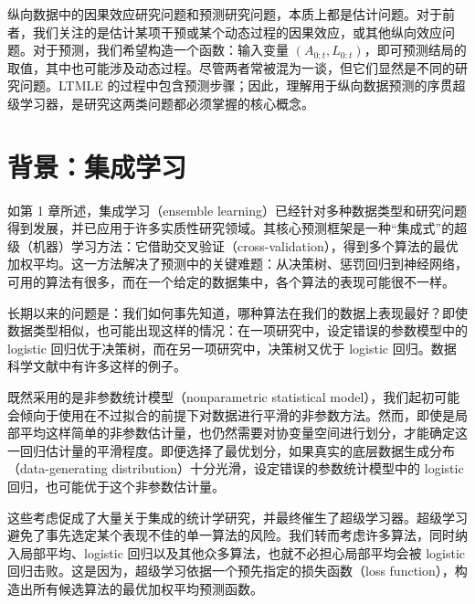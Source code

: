 \begin{sourcebox}[纵向数据中的效应估计与预测]
纵向数据中的因果效应研究问题和预测研究问题，本质上都是估计问题。对于前者，我们关注的是估计某项干预或某个动态过程的因果效应，或其他纵向效应问题。对于预测，我们希望构造一个函数：输入变量 $(A_{0:t},L_{0:t})$，即可预测结局的取值，其中也可能涉及动态过程。尽管两者常被混为一谈，但它们显然是不同的研究问题。LTMLE 的过程中包含预测步骤；因此，理解用于纵向数据预测的序贯超级学习器，是研究这两类问题都必须掌握的核心概念。
\end{sourcebox}

\section{背景：集成学习}
\label{sec:ch03-ensemble-background}

如第 1 章所述，集成学习（ensemble learning）已经针对多种数据类型和研究问题得到发展，并已应用于许多实质性研究领域。其核心预测框架是一种“集成式”的超级（机器）学习方法：它借助交叉验证（cross-validation），得到多个算法的最优加权平均。这一方法解决了预测中的关键难题：从决策树、惩罚回归到神经网络，可用的算法有很多，而在一个给定的数据集中，各个算法的表现可能很不一样。

长期以来的问题是：我们如何事先知道，哪种算法在我们的数据上表现最好？即使数据类型相似，也可能出现这样的情况：在一项研究中，设定错误的参数模型中的 logistic 回归优于决策树，而在另一项研究中，决策树又优于 logistic 回归。数据科学文献中有许多这样的例子。

既然采用的是非参数统计模型（nonparametric statistical model），我们起初可能会倾向于使用在不过拟合的前提下对数据进行平滑的非参数方法。然而，即使是局部平均这样简单的非参数估计量，也仍然需要对协变量空间进行划分，才能确定这一回归估计量的平滑程度。即便选择了最优划分，如果真实的底层数据生成分布（data-generating distribution）十分光滑，设定错误的参数统计模型中的 logistic 回归，也可能优于这个非参数估计量。

这些考虑促成了大量关于集成的统计学研究，并最终催生了超级学习器。超级学习避免了事先选定某个表现不佳的单一算法的风险。我们转而考虑许多算法，同时纳入局部平均、logistic 回归以及其他众多算法，也就不必担心局部平均会被 logistic 回归击败。这是因为，超级学习依据一个预先指定的损失函数（loss function），构造出所有候选算法的最优加权平均预测函数。

